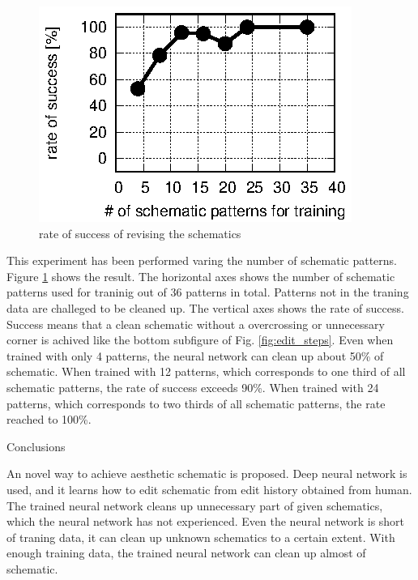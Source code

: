 \documentclass[twocolumn]{article}
\makeatletter
\def\section{\@startsection {section}{1}{\z@}{20pt plus 2pt minus 2pt}
{8pt plus 2pt minus 2pt}{\centering\normalsize\sc
\edef\@svsec{\thesection.\ }}}
\def\thesection{\Roman{section}}
\makeatother
\begin{document}
\begin{figure}[!tp]
 \begin{center}
  \begin{minipage}{\hsize}
   \includegraphics[width=\hsize]{fig/test_data.eps}
   \caption{rate of success of revising the schematics}
   \label{fig:test_data}
  \end{minipage}
 \end{center}
\end{figure}

This experiment has been performed varing the number of schematic patterns.
Figure \ref{fig:test_data} shows the result.
The horizontal axes shows the number of schematic patterns used for traninig
out of 36 patterns in total.
Patterns not in the traning data are challeged to be cleaned up.
The vertical axes shows the rate of success.
Success means that a clean schematic
without a overcrossing or unnecessary corner is achived
like the bottom subfigure of Fig. \ref{fig:edit_steps}.
Even when trained with only 4 patterns,
the neural network can clean up about 50\% of schematic.
When trained with 12 patterns,
which corresponds to one third of all schematic patterns,
the rate of success exceeds 90\%.
When trained with 24 patterns,
which corresponds to two thirds of all schematic patterns,
the rate reached to 100\%.


\section{Conclusions}

An novel way to achieve aesthetic schematic is proposed.
Deep neural network is used, and it learns how to edit schematic
from edit history obtained from human.
The trained neural network cleans up unnecessary part of given schematics,
which the neural network has not experienced.
Even the neural network is short of traning data,
it can clean up unknown schematics to a certain extent.
With enough training data,
the trained neural network can clean up almost of schematic.
\end{document}
